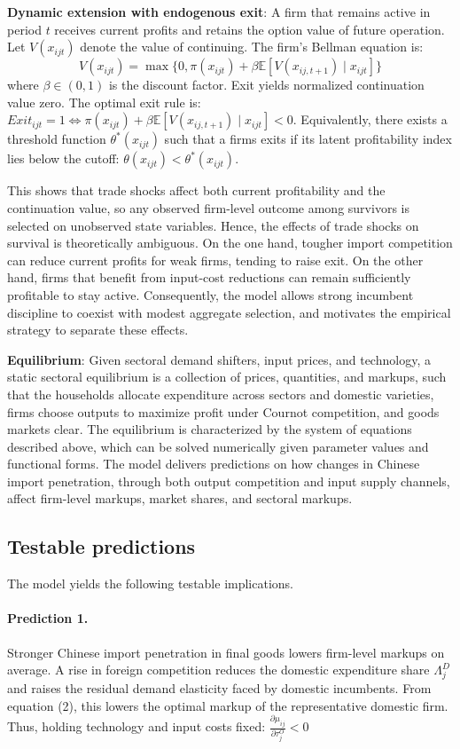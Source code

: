 \documentclass[12pt]{article}
\begin{document}
\textbf{Dynamic extension with endogenous exit}: A firm that remains active in period $t$ receives current profits and retains the option value of future operation. Let $V(x_{ijt})$ denote the value of continuing. The firm's Bellman equation is: $$V(x_{ijt}) = \max \{ 0, \pi(x_{ijt}) + \beta \mathbb{E} [V(x_{ij,t+1}) \mid x_{ijt}] \}$$ where $\beta \in (0,1)$ is the discount factor. Exit yields normalized continuation value zero. The optimal exit rule is: $Exit_{ijt}=1 \Leftrightarrow \pi(x_{ijt}) + \beta \mathbb{E} [V(x_{ij,t+1}) \mid x_{ijt}] < 0 $. Equivalently, there exists a threshold function $\theta^*(x_{ijt})$ such that a firms exits if its latent profitability index lies below the cutoff: $\theta(x_{ijt}) < \theta^*(x_{ijt})$. 

This shows that trade shocks affect both current profitability and the continuation value, so any observed firm-level outcome among survivors is selected on unobserved state variables. Hence, the effects of trade shocks on survival is theoretically ambiguous. On the one hand, tougher import competition can reduce current profits for weak firms, tending to raise exit. On the other hand, firms that benefit from input-cost reductions can remain sufficiently profitable to stay active. Consequently, the model allows strong incumbent discipline to coexist with modest aggregate selection, and motivates the empirical strategy to separate these effects.

\textbf{Equilibrium}: Given sectoral demand shifters, input prices, and technology, a static sectoral equilibrium is a collection of prices, quantities, and markups, such that the households allocate expenditure across sectors and domestic varieties, firms choose outputs to maximize profit under Cournot competition, and goods markets clear. The equilibrium is characterized by the system of equations described above, which can be solved numerically given parameter values and functional forms. The model delivers predictions on how changes in Chinese import penetration, through both output competition and input supply channels, affect firm-level markups, market shares, and sectoral markups.

\subsection{Testable predictions}

The model yields the following testable implications.
\paragraph{Prediction 1.} Stronger Chinese import penetration in final goods lowers firm-level markups on average.  
A rise in foreign competition reduces the domestic expenditure share $\Lambda_j^D$ and raises the residual demand elasticity faced by domestic incumbents. From equation (2), this lowers the optimal markup of the representative domestic firm. Thus, holding technology and input costs fixed: $\frac{\partial \mu_{ij}}{\partial \tau_j^O} < 0$
\end{document}
